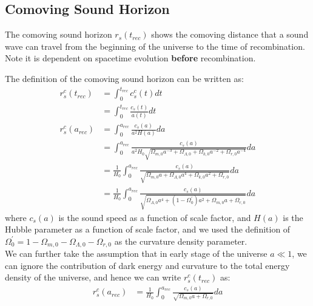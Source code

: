 \clearpage
\subsection{Comoving Sound Horizon}
\begin{intuition}
    The comoving sound horizon $r_s(t_{rec})$ shows the comoving distance that a sound wave can travel from the beginning of the universe to the time of recombination. Note it is dependent on spacetime evolution \textbf{before} recombination.
\end{intuition}

\bigskip \noindent
\begin{foundation}
    The definition of the comoving sound horizon can be written as:
    \begin{align*}
        r_s^c(t_{rec}) &= \int_0^{t_{rec}} c_s^c(t) dt \\
        &= \int_0^{t_{rec}} \frac{c_s(t)}{a(t)} dt \\
        r_s^c(a_{rec}) &= \int_0^{a_{rec}} \frac{c_s(a)}{a^2 H(a)} da \\
        &= \int_0^{a_{rec}} \frac{c_s(a)}{a^2 H_0 \sqrt{\Omega_{m,0} a^{-3} + \Omega_{\Lambda,0} + \Omega_{k,0} a^{-2} + \Omega_{r,0} a^{-4}}} da \\
        &= \frac{1}{H_0} \int_0^{a_{rec}} \frac{c_s(a)}{\sqrt{\Omega_{m,0} a + \Omega_{\Lambda,0} a^4 + \Omega_{k,0} a^2 + \Omega_{r,0}}} da \\
            &= \frac{1}{H_0} \int_0^{a_{rec}} \frac{c_s(a)}{\sqrt{\Omega_{\Lambda,0} a^4 + (1 - \Omega_{0}^{'}) a^2 + \Omega_{m,0} a + \Omega_{r,0}}} da
    \end{align*}
    where $c_s(a)$ is the sound speed as a function of scale factor, and $H(a)$ is the Hubble parameter as a function of scale factor, and we used the definition of $\Omega_0^{'} = 1 - \Omega_{m,0} - \Omega_{\Lambda,0} - \Omega_{r,0}$ as the curvature density parameter. \\

    We can further take the assumption that in early stage of the universe $a \ll 1$, we can ignore the contribution of dark energy and curvature to the total energy density of the universe, and hence we can write $r_s^c(t_{rec})$ as:
    \begin{align*}
        r_s^c(a_{rec}) &= \frac{1}{H_0} \int_0^{a_{rec}} \frac{c_s(a)}{\sqrt{\Omega_{m,0} a + \Omega_{r,0}}} da
    \end{align*}
\end{foundation}

